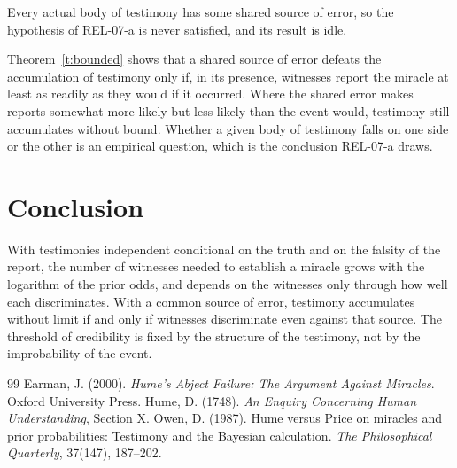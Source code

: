 \documentclass{situationist-preprint}
\begin{document}
\begin{objection}
Every actual body of testimony has some shared source of error, so the hypothesis of REL-07-a is never satisfied, and its result is idle.
\end{objection}

\begin{reply}
Theorem~\ref{t:bounded} shows that a shared source of error defeats the accumulation of testimony only if, in its presence, witnesses report the miracle at least as readily as they would if it occurred. Where the shared error makes reports somewhat more likely but less likely than the event would, testimony still accumulates without bound. Whether a given body of testimony falls on one side or the other is an empirical question, which is the conclusion REL-07-a draws.
\end{reply}

\section{Conclusion}

With testimonies independent conditional on the truth and on the falsity of the report, the number of witnesses needed to establish a miracle grows with the logarithm of the prior odds, and depends on the witnesses only through how well each discriminates. With a common source of error, testimony accumulates without limit if and only if witnesses discriminate even against that source. The threshold of credibility is fixed by the structure of the testimony, not by the improbability of the event.

\begin{thebibliography}{99}\small
{} Earman, J. (2000). \emph{Hume's Abject Failure: The Argument Against Miracles}. Oxford University Press.
 Hume, D. (1748). \emph{An Enquiry Concerning Human Understanding}, Section X.
 Owen, D. (1987). Hume versus Price on miracles and prior probabilities: Testimony and the Bayesian calculation. \emph{The Philosophical Quarterly}, 37(147), 187--202.
\end{thebibliography}
\end{document}
